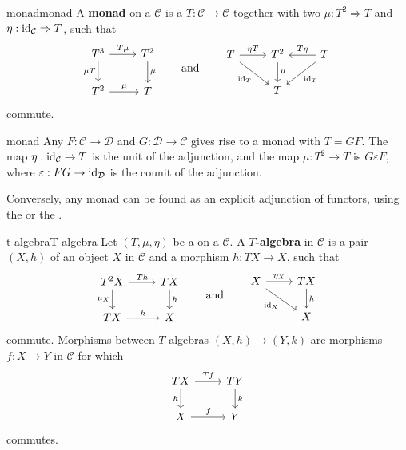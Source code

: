 \begin{topic}{monad}{monad}
    A \textbf{monad} on a  $\mathcal{C}$ is a  $T : \mathcal{C} \to \mathcal{C}$ together with two  $\mu : T^2 \Rightarrow T$ and $\eta : \textup{id}_{\mathcal{C}} \Rightarrow T$, such that
    \[ \begin{tikzcd} T^3 \arrow{r}{T \mu} \arrow[swap]{d}{\mu T} & T^2 \arrow{d}{\mu} \\ T^2 \arrow{r}{\mu} & T \end{tikzcd} \qquad \text{and} \qquad \begin{tikzcd} T \arrow{r}{\eta T} \arrow[swap]{dr}{\id_T} & T^2 \arrow{d}{\mu} & \arrow[swap]{l}{T \eta} T \arrow{ld}{\id_T} \\ & T & \end{tikzcd} \]
    commute.
\end{topic}

\begin{example}{monad}
    Any  $F : \mathcal{C} \to \mathcal{D}$ and $G : \mathcal{D} \to \mathcal{C}$ gives rise to a monad with $T = GF$. The map $\eta : \textup{id}_{\mathcal{C}} \to T$ is the unit of the adjunction, and the map $\mu : T^2 \to T$ is $G \varepsilon F$, where $\varepsilon : FG \to \textup{id}_{\mathcal{D}}$ is the counit of the adjunction.
    
    Conversely, any monad can be found as an explicit adjunction of functors, using the  or the .
\end{example}

\begin{topic}{t-algebra}{T-algebra}
    Let $(T, \mu, \eta)$ be a  on a  $\mathcal{C}$. A \textbf{$T$-algebra} in $\mathcal{C}$ is a pair $(X, h)$ of an object $X$ in $\mathcal{C}$ and a morphism $h : TX \to X$, such that
    \[ \begin{tikzcd} T^2 X \arrow[swap]{d}{\mu_X} \arrow{r}{Th} & TX \arrow{d}{h} \\ TX \arrow{r}{h} & X \end{tikzcd} \qquad \text{and} \qquad \begin{tikzcd} X \arrow[swap]{dr}{\id_X} \arrow{r}{\eta_X} & TX \arrow{d}{h} \\ & X \end{tikzcd} \]
    commute. Morphisms between $T$-algebras $(X, h) \to (Y, k)$ are morphisms $f : X \to Y$ in $\mathcal{C}$ for which
    \[ \begin{tikzcd} TX \arrow{r}{Tf} \arrow[swap]{d}{h} & TY \arrow{d}{k} \\ X \arrow{r}{f} & Y \end{tikzcd} \]
    commutes.
\end{topic}

